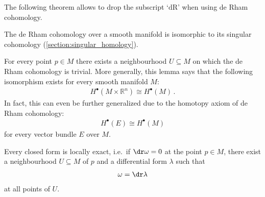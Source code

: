     The following theorem allows to drop the subscript `$\text{dR}$' when using de Rham cohomology.
    \begin{theorem}[de Rham]
        The de Rham cohomology over a smooth manifold is isomorphic to its singular cohomology (\cref{section:singular_homology}).
    \end{theorem}

    \begin{theorem}\label{bundle:poincare}
        For every point $p\in M$ there exists a neighbourhood $U\subseteq M$ on which the de Rham cohomology is trivial. More generally, this lemma says that the following isomorphism exists for every smooth manifold $M$:
        \begin{gather}
            H^\bullet(M\times\mathbb{R}^n)\cong H^\bullet(M)\,.
        \end{gather}
        In fact, this can even be further generalized due to the homotopy axiom of de Rham cohomology:
        \begin{gather}
            H^\bullet(E)\cong H^\bullet(M)
        \end{gather}
        for every vector bundle $E$ over $M$.
    \end{theorem}
    \begin{result}
        Every closed form is locally exact, i.e.~if $\dr\omega=0$ at the point $p\in M$, there exist a neighbourhood $U\subseteq M$ of $p$ and a differential form $\lambda$ such that
        \begin{gather}
            \omega=\dr\lambda
        \end{gather}
        at all points of $U$.
    \end{result}


